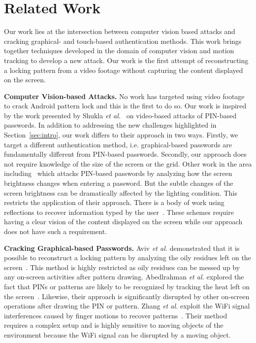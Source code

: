 \section{Related Work}
\label{section: relate-work}
Our work lies at the intersection between computer vision based attacks and
cracking graphical- and touch-based authentication methods. This work brings
together techniques developed in the domain of computer vision and motion
tracking to develop a new attack. Our work is the first attempt
of reconstructing a locking pattern from a video footage without
capturing the content displayed on the screen.

\noindent \textbf{Computer Vision-based Attacks.} No work has targeted using video
footage to crack Android pattern lock and this is the first to do so. Our work is inspired by the work
presented by Shukla \emph{et al.}~\cite{shukla2014beware} on video-based attacks of
PIN-based passwords. In addition to addressing the new challenges highlighted in Section~\ref{sec:intro}, our work differs to their approach in
two ways.
Firstly, we target a different authentication method, i.e. graphical-based passwords are fundamentally different from PIN-based passwords. %
Secondly, our approach does not require knowledge of the size of the screen or the grid.
Other work in the area including~\cite{yue2014blind} which attacks PIN-based passwords by analyzing how the screen brightness changes when entering a password.
But the subtle changes of the screen brightness can be dramatically affected by the lighting condition. This restricts the application of their approach.
There is a body of work using reflections to recover information typed by the user~\cite{kuhn2002compromising,xu2013seeing,raguram2011ispy,backes2009tempest}. These schemes require having a clear vision of the content displayed on the screen while our approach does not have such a requirement.

\noindent \textbf{Cracking Graphical-based Passwords.} Aviv \emph{et al.} demonstrated that it is possible to
reconstruct a locking pattern by analyzing the oily residues left on the screen~\cite{aviv2010smudge}. This method is
highly restricted as oily residues can be messed up by any on-screen activities after pattern drawing. Abedlrahman
\emph{et al.} explored the fact that PINs or patterns are likely to be recognized by tracking the heat left on the
screen~\cite{abdelrahman2017stay}. Likewise, their approach is significantly disrupted by other on-screen operations
after drawing the PIN or pattern. Zhang \emph{et al.} exploit the WiFi signal interferences caused by finger motions to
recover patterns~\cite{zhang2016privacy}. Their method requires a complex setup and is highly sensitive to moving
objects of the environment
because the WiFi signal can be disrupted by a moving object.


